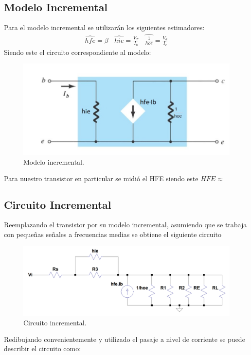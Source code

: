 \documentclass[a4paper]{article}
\begin{document}
\subsection{Modelo Incremental}
Para el modelo incremental se utilizarán los siguientes estimadores:
\begin{align}\hat{hfe}=\beta \ \ \ \  \hat{hie} = \frac{V_T}{I_b} \ \ \ \ \hat{\frac{1}{hoe}} = \frac{V_a}{I_c}\end{align}
Siendo este el circuito correspondiente al modelo:
\begin{figure} [H]
	\centering
	\includegraphics[width=\textwidth]{imagenes/modeloincremetnal.jpg}
	\caption{Modelo incremental.}
	\label{fig:modinc}
\end{figure}
Para nuestro transistor en particular se midió el HFE siendo este $HFE \approx $
\subsection{Circuito Incremental}
Reemplazando el transistor por su modelo incremental, asumiendo que se trabaja con pequeñas señales a frecuencias medias se obtiene el siguiente circuito
\begin{figure} [H]
	\centering
	\includegraphics[width=\textwidth]{imagenes/circinc.png}
	\caption{Circuito incremental.}
	\label{fig:circinc}
\end{figure}
Redibujando convenientemente y utilizado el pasaje a nivel de corriente se puede describir el circuito como:
\end{document}
